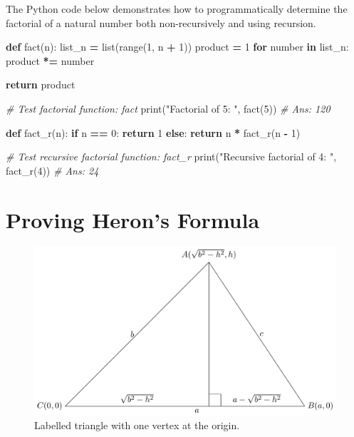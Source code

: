 \documentclass[
]{book}
\newenvironment{Shaded}{\begin{snugshade}}{\end{snugshade}}
\newcommand{\BuiltInTok}[1]{#1}
\newcommand{\CommentTok}[1]{\textcolor[rgb]{0.56,0.35,0.01}{\textit{#1}}}
\newcommand{\ControlFlowTok}[1]{\textcolor[rgb]{0.13,0.29,0.53}{\textbf{#1}}}
\newcommand{\DecValTok}[1]{\textcolor[rgb]{0.00,0.00,0.81}{#1}}
\newcommand{\KeywordTok}[1]{\textcolor[rgb]{0.13,0.29,0.53}{\textbf{#1}}}
\newcommand{\NormalTok}[1]{#1}
\newcommand{\OperatorTok}[1]{\textcolor[rgb]{0.81,0.36,0.00}{\textbf{#1}}}
\newcommand{\StringTok}[1]{\textcolor[rgb]{0.31,0.60,0.02}{#1}}
\begin{document}
The Python code below demonstrates how to programmatically determine the factorial of a natural number both non-recursively and using recursion.

\begin{Shaded}
\begin{Highlighting}[]
\KeywordTok{def}\NormalTok{ fact(n):}
\NormalTok{    list\_n }\OperatorTok{=} \BuiltInTok{list}\NormalTok{(}\BuiltInTok{range}\NormalTok{(}\DecValTok{1}\NormalTok{, n }\OperatorTok{+} \DecValTok{1}\NormalTok{))}
\NormalTok{    product }\OperatorTok{=} \DecValTok{1}
    \ControlFlowTok{for}\NormalTok{ number }\KeywordTok{in}\NormalTok{ list\_n:}
\NormalTok{        product }\OperatorTok{*=}\NormalTok{ number}

    \ControlFlowTok{return}\NormalTok{ product}

\CommentTok{\# Test factorial function: fact}
\BuiltInTok{print}\NormalTok{(}\StringTok{"Factorial of 5: "}\NormalTok{, fact(}\DecValTok{5}\NormalTok{))  }\CommentTok{\# Ans: 120}

\KeywordTok{def}\NormalTok{ fact\_r(n):}
    \ControlFlowTok{if}\NormalTok{ n }\OperatorTok{==} \DecValTok{0}\NormalTok{:}
        \ControlFlowTok{return} \DecValTok{1}
    \ControlFlowTok{else}\NormalTok{:}
        \ControlFlowTok{return}\NormalTok{ n }\OperatorTok{*}\NormalTok{ fact\_r(n }\OperatorTok{{-}} \DecValTok{1}\NormalTok{)}

\CommentTok{\# Test recursive factorial function: fact\_r}
\BuiltInTok{print}\NormalTok{(}\StringTok{"Recursive factorial of 4: "}\NormalTok{, fact\_r(}\DecValTok{4}\NormalTok{))  }\CommentTok{\# Ans: 24}
\end{Highlighting}
\end{Shaded}

\chapter{Proving Heron's Formula}\label{proving-herons-formula}

\begin{figure}
\centering
\includegraphics[width=0.8\linewidth,height=\textheight,keepaspectratio]{./figure/triangle.png}
\caption{Labelled triangle with one vertex at the origin.}
\end{figure}
\end{document}
